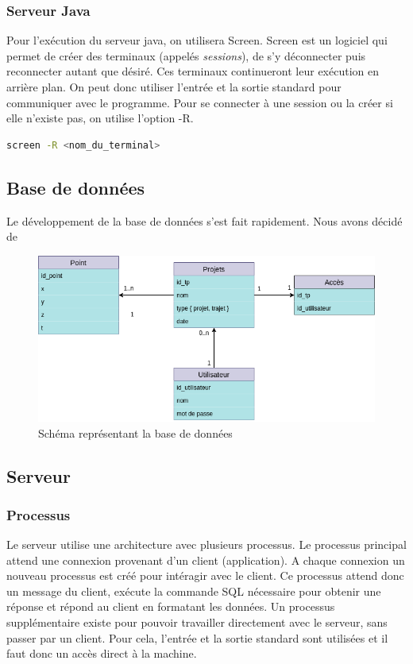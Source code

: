 \subsubsection{Serveur Java}

Pour l'exécution du serveur java, on utilisera Screen.
Screen est un logiciel qui permet de créer des terminaux (appelés \emph{sessions}), de s'y déconnecter puis reconnecter autant que désiré.
Ces terminaux continueront leur exécution en arrière plan. On peut donc utiliser l'entrée et la sortie standard pour communiquer avec le programme.
Pour se connecter à une session ou la créer si elle n'existe pas, on utilise l'option -R.
\begin{lstlisting}[language=bash]
    screen -R <nom_du_terminal>
\end{lstlisting}

\subsection{Base de données}
Le développement de la base de données s'est fait rapidement. Nous avons décidé de 
\begin{figure}[ht]
    \label{Schéma de la base de données}
    \centering
    \includegraphics[scale=0.6]{images/bdd.png}
    \caption{Schéma représentant la base de données}
\end{figure}

\subsection{Serveur}
\subsubsection{Processus}
Le serveur utilise une architecture avec plusieurs processus. Le processus principal attend une connexion provenant d'un client (application).
A chaque connexion un nouveau processus est créé pour intéragir avec le client. Ce processus attend donc un message du client, exécute la commande
SQL nécessaire pour obtenir une réponse et répond au client en formatant les données. Un processus supplémentaire existe pour pouvoir
travailler directement avec le serveur, sans passer par un client. Pour cela, l'entrée et la sortie standard sont utilisées et il faut donc un accès direct à la machine.
